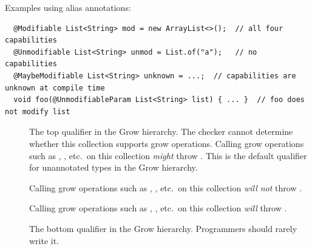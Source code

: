 \noindent
Examples using alias annotations:

\begin{Verbatim}
  @Modifiable List<String> mod = new ArrayList<>();  // all four capabilities
  @Unmodifiable List<String> unmod = List.of("a");   // no capabilities
  @MaybeModifiable List<String> unknown = ...;  // capabilities are unknown at compile time
  void foo(@UnmodifiableParam List<String> list) { ... }  // foo does not modify list
\end{Verbatim}



\begin{description}
\item[]
The top qualifier in the Grow hierarchy.
The checker cannot determine whether this collection supports grow
operations.
Calling grow operations such as , , etc.\ on this
collection \emph{might} throw \UnsupportedOperationException.
This is the default qualifier for unannotated types in the
Grow hierarchy.

\item[]
Calling grow operations such as , , etc.\ on this
collection \emph{will not} throw \UnsupportedOperationException.

\item[]
Calling grow operations such as , , etc.\ on this
collection \emph{will} throw \UnsupportedOperationException.

\item[]
The bottom qualifier in the Grow hierarchy.  Programmers should rarely write it.
\end{description}


